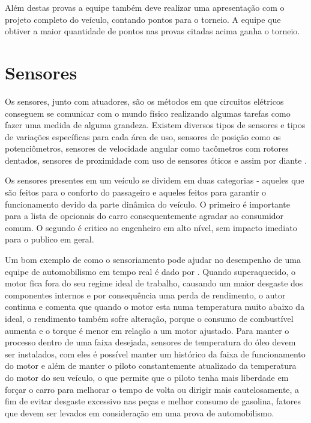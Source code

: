Além destas provas a equipe também deve realizar uma apresentação com o projeto completo do veículo, contando pontos para o torneio. A equipe que obtiver a maior quantidade de pontos nas provas citadas acima ganha o torneio.

\section{Sensores}
\label{sec:sensores}
Os sensores, junto com atuadores, são os métodos em que circuitos elétricos conseguem se comunicar com o mundo físico realizando algumas tarefas como fazer uma medida de alguma grandeza. Existem diversos tipos de sensores e tipos de variações específicas para cada área de uso, sensores de posição como os potenciômetros, sensores de velocidade angular como tacômetros com rotores dentados, sensores de proximidade com uso de sensores óticos e assim por diante \cite{kilian2001modern}. 

Os sensores presentes em um veículo se dividem em duas categorias \cite{vehicleDataAcquisition2014} - aqueles que são feitos para o conforto do passageiro e aqueles feitos para garantir o funcionamento devido da parte dinâmica do veículo. O primeiro é importante para a lista de opcionais do carro consequentemente agradar ao consumidor comum. O segundo é critico ao engenheiro em alto nível, sem impacto imediato para o publico em geral.

Um bom exemplo de como o sensoriamento pode ajudar no desempenho de uma equipe de automobilismo em tempo real é dado por . Quando superaquecido, o motor fica fora do seu regime ideal de trabalho, causando um maior desgaste dos componentes internos e por consequência uma perda de rendimento, o autor continua e comenta que quando o motor esta numa temperatura muito abaixo da ideal, o rendimento também sofre alteração, porque o consumo de combustível aumenta e o torque é menor em relação a um motor ajustado. Para manter o processo dentro de uma faixa desejada, sensores de temperatura do óleo devem ser instalados, com eles é possível manter um histórico da faixa de funcionamento do motor e além de manter o piloto constantemente atualizado da temperatura do motor do seu veículo, o que permite que o piloto tenha mais liberdade em forçar o carro para melhorar o tempo de volta ou dirigir mais cautelosamente, a fim de evitar desgaste excessivo nas peças e melhor consumo de gasolina, fatores que devem ser levados em consideração em uma prova de automobilismo. 

